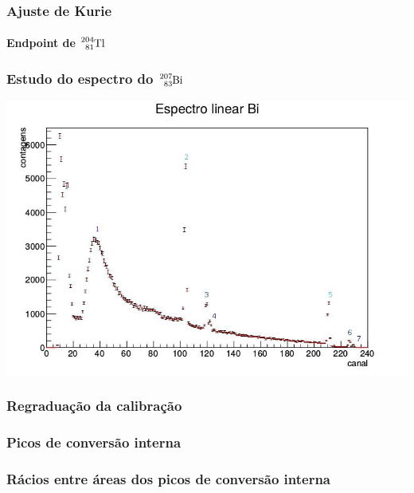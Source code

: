 \documentclass[10pt]{beamer}
\begin{document}
\begin{frame}\frametitle{Ajuste de Kurie}\framesubtitle{Endpoint de $\ce{^{204}_{81}Tl}$}

  \begin{block}

  \end{block}

\end{frame}

\begin{frame}\frametitle{Estudo do espectro do $\ce{^{207}_{83}Bi}$}

  \begin{block}
   \centering
   \includegraphics[scale=0.25]{espectro_bi.jpg}
  \end{block}

\end{frame}

\begin{frame}\frametitle{Regraduação da calibração}

  \begin{block}

  \end{block}

\end{frame}

\begin{frame}\frametitle{Picos de conversão interna}

  \begin{block}

  \end{block}

\end{frame}

\begin{frame}\frametitle{Rácios entre áreas dos picos de conversão interna}

  \begin{block}

  \end{block}

\end{frame}
\end{document}
